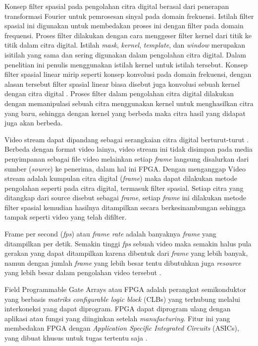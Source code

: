 Konsep filter spasial pada pengolahan citra digital berasal dari penerapan transformasi Fourier untuk pemrosesan sinyal pada domain frekuensi. Istilah filter spasial ini digunakan untuk membedakan proses ini dengan filter pada domain frequensi. Proses filter dilakukan dengan cara menggeser filter kernel dari titik ke titik dalam citra digital. Istilah \textit{mask}, \textit{kernel}, \textit{template}, dan \textit{window} merupakan isitilah yang sama dan sering digunakan dalam pengolahan citra digital. Dalam penelitian ini penulis menggunakan istilah kernel untuk istilah tersebut. Konsep filter spasial linear mirip seperti konsep konvolusi pada domain frekuensi, dengan alasan tersebut filter spasial linear biasa disebut juga konvolusi sebuah kernel dengan citra digital . Proses filter dalam pengolahan citra digital dilakukan dengan memanipulasi sebuah citra menggunakan kernel untuk menghasilkan citra yang baru, sehingga dengan kernel yang berbeda maka citra hasil yang didapat juga akan berbeda. 


Video stream dapat dipandang sebagai serangkaian citra digital berturut-turut . Berbeda dengan format video lainya, video stream ini tidak disimpan pada media penyimpanan sebagai file video melainkan setiap \textit{frame} langsung disalurkan dari sumber (\textit{source}) ke penerima, dalam hal ini FPGA. Dengan menganggap Video stream adalah kumpulan citra digital (\textit{frame}) maka dapat dilakukan metode pengolahan seperti pada citra digital, termasuk filter spasial. Setiap citra yang ditangkap dari source disebut sebagai \textit{frame}, setiap \textit{frame} ini dilakukan metode filter spasial kemudian hasilnya ditampilkan secara berkesinambungan sehingga tampak seperti video yang telah difilter.

Frame per second (\textit{fps}) atau \textit{frame rate} adalah banyaknya \textit{frame} yang ditampilkan per detik. Semakin tinggi \textit{fps} sebuah video maka semakin halus pula gerakan yang dapat ditampilkan karena dibentuk dari \textit{frame} yang lebih banyak, namun dengan jumlah \textit{frame} yang lebih besar tentu dibutuhkan juga \textit{resource} yang lebih besar dalam pengolahan video tersebut . 


Field Programmable Gate Arrays atau FPGA adalah perangkat semikonduktor yang berbasis \textit{matriks configurable logic block} (CLBs) yang terhubung melalui interkoneksi yang dapat diprogram. FPGA dapat diprogram ulang dengan aplikasi atau fungsi yang diinginkan setelah \textit{manufacturing}. Fitur ini yang membedakan FPGA dengan \textit{Application Specific Integrated Circuits} (ASICs), yang dibuat khusus untuk tugas tertentu saja .

